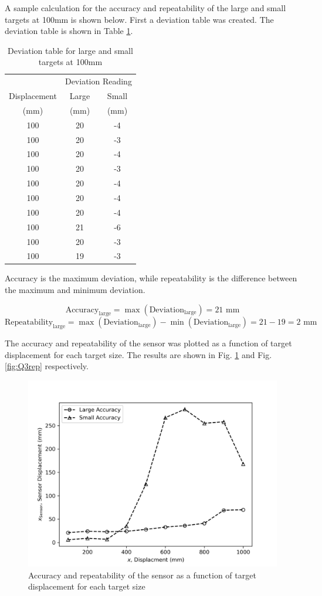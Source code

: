 A sample calculation for the accuracy and repeatability of the large and small targets at 100mm is shown below. First a deviation table was created. 
The deviation table is shown in Table \ref{tab:Q3a-deviation}.

\begin{table}[h]
    \centering
    \caption{Deviation table for large and small targets at 100mm}
    \label{tab:Q3a-deviation}
    \begin{tabular}{ccc}
        \hline
        & \multicolumn{2}{c}{Deviation Reading} \\
        \cline{2-3}
        Displacement & Large & Small \\
        (mm) & (mm) & (mm) \\
        \midrule
        100 & 20 & -4 \\
        100 & 20 & -3 \\
        100 & 20 & -4 \\
        100 & 20 & -3 \\
        100 & 20 & -4 \\
        100 & 20 & -4 \\
        100 & 20 & -4 \\
        100 & 21 & -6 \\
        100 & 20 & -3 \\
        100 & 19 & -3 \\
        \hline
    \end{tabular}
\end{table}

Accuracy is the maximum deviation, while repeatability is the difference between the maximum and minimum deviation.

\[
    \boxed{\text{Accuracy}_\text{large} = \max(\text{Deviation}_\text{large}) = 21 \text{ mm}}
\]
\[
    \boxed{\text{Repeatability}_\text{large} = \max(\text{Deviation}_\text{large}) - \min(\text{Deviation}_\text{large}) = 21 - 19 = 2 \text{ mm}}
\]

\FloatBarrier
The accuracy and repeatability of the sensor was plotted as a function of target displacement for each target size. The results are shown in Fig. \ref{fig:Q3acc} 
and Fig. \ref{fig:Q3rep} respectively.
\begin{figure}[h]
    \centering
    \includegraphics[width=0.6\linewidth]{matplotlib/Q3acc.png}
    \caption{Accuracy and repeatability of the sensor as a function of target displacement for each target size}
    \label{fig:Q3acc}
\end{figure}

